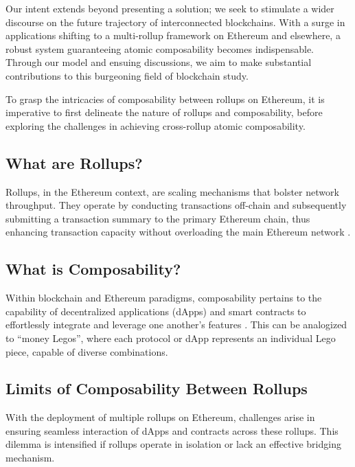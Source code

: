 \documentclass{article}
\begin{document}
Our intent extends beyond presenting a solution; we seek to stimulate a wider discourse on the future trajectory of interconnected blockchains. With a surge in applications shifting to a multi-rollup framework on Ethereum and elsewhere, a robust system guaranteeing atomic composability becomes indispensable. Through our model and ensuing discussions, we aim to make substantial contributions to this burgeoning field of blockchain study.

To grasp the intricacies of composability between rollups on Ethereum, it is imperative to first delineate the nature of rollups and composability, before exploring the challenges in achieving cross-rollup atomic composability.

\subsection{What are Rollups?}\label{what-are-rollups}

Rollups, in the Ethereum context, are scaling mechanisms that bolster
network throughput. They operate by conducting transactions off-chain
and subsequently submitting a transaction summary to the primary
Ethereum chain, thus enhancing transaction capacity without overloading
the main Ethereum network \cite{buterin2020ethereum}.

\subsection{What is Composability?}\label{what-is-composability}

Within blockchain and Ethereum paradigms, composability pertains to the
capability of decentralized applications (dApps) and smart contracts to
effortlessly integrate and leverage one another's features \cite{schar2020decentralized}. This can be analogized to ``money Legos'', where each protocol or dApp represents an individual Lego piece, capable of diverse
combinations.

\subsection{Limits of Composability Between
Rollups}\label{limits-of-composability-between-rollups}

With the deployment of multiple rollups on Ethereum, challenges arise in
ensuring seamless interaction of dApps and contracts across these
rollups. This dilemma is intensified if rollups operate in isolation or
lack an effective bridging mechanism.
\end{document}
